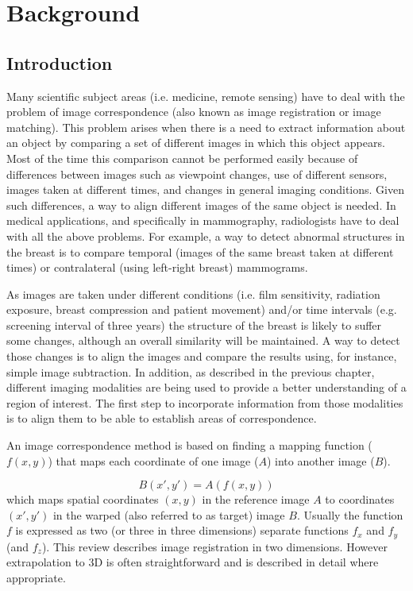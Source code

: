 \chapter{Background} \label{chap:background}

\section{Introduction}
Many scientific subject areas (i.e. medicine, remote sensing) have
to deal with the problem of image correspondence (also known as
image registration or image matching). This problem arises when
there is a need to extract information about an object by
comparing a set of different images in which this object appears.
Most of the time this comparison cannot be performed easily
because of differences between images such as viewpoint changes,
use of different sensors, images taken at different times, and
changes in general imaging conditions. Given such differences, a
way to align different images of the same object is needed. In
medical applications, and specifically in mammography,
radiologists have to deal with all the above problems. For
example, a way to detect abnormal structures in the breast is to
compare temporal (images of the same breast taken at different
times) or contralateral (using left-right breast) mammograms.

As images are taken under different conditions (i.e. film
sensitivity, radiation exposure, breast compression and patient
movement) and/or time intervals (e.g. screening interval of three
years) the structure of the breast is likely to suffer some
changes, although an overall similarity will be maintained. A way
to detect those changes is to align the images and compare the
results using, for instance, simple image subtraction. In
addition, as described in the previous chapter, different imaging
modalities are being used to provide a better understanding of a
region of interest. The first step to incorporate information from
those modalities is to align them to be able to establish areas of
correspondence.

An image correspondence method is based on finding a mapping
function ($f(x,y)$) that maps each coordinate of one image ($A$)
into another image ($B$).

\begin{equation}
B(x',y')=A(f(x,y))
\end{equation}
\noindent which maps spatial coordinates $(x,y)$ in the reference
image $A$ to coordinates $(x',y')$ in the warped (also referred to
as target) image $B$. Usually the function $f$ is expressed as two
(or three in three dimensions) separate functions $f_x$ and $f_y$
(and $f_z$). This review describes image registration in two
dimensions. However extrapolation to 3D is often straightforward
and is described in detail where appropriate.

